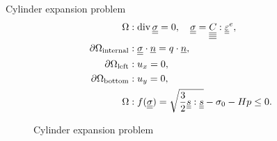 \documentclass[9pt]{beamer}
\begin{document}
\begin{frame}{Cylinder expansion problem}
  \begin{align}
    \Omega &: \operatorname{div} \underline{\underline{\sigma}} = 0, \quad \underline{\underline{\sigma}} = \underline{\underline{\underline{\underline{C_{}}}}} : \underline{\underline{\varepsilon}}^e, \\
    \partial\Omega_\text{internal} &: \underline{\underline{\sigma}} \cdot \underline{n} = q \cdot \underline{n}, \\
    \partial\Omega_\text{left} &: u_x = 0, \\
    \partial\Omega_\text{bottom} &: u_y = 0, \label{eqn:cylinder_bc}  \\
    \Omega &: f(\underline{\underline{\sigma}}) = \sqrt{\frac{3}{2} \underline{\underline{s}} : \underline{\underline{s}}} - \sigma_0 - Hp \leq 0.
  \end{align}
  \begin{figure}[H]
    \begin{minipage}[h]{0.49\linewidth}
    \end{minipage}
    \hfill
    \begin{minipage}[h]{0.49\linewidth}
    \end{minipage}
    \caption{Cylinder expansion problem}
    \label{fig:domain}
  \end{figure}
\end{frame}
\end{document}
